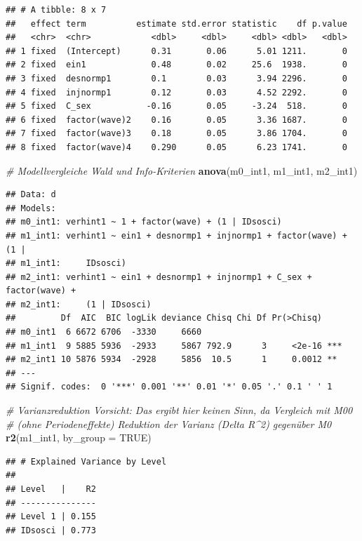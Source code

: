 \documentclass[
]{book}
\newenvironment{Shaded}{\begin{snugshade}}{\end{snugshade}}
\newcommand{\CommentTok}[1]{\textcolor[rgb]{0.56,0.35,0.01}{\textit{#1}}}
\newcommand{\DataTypeTok}[1]{\textcolor[rgb]{0.13,0.29,0.53}{#1}}
\newcommand{\KeywordTok}[1]{\textcolor[rgb]{0.13,0.29,0.53}{\textbf{#1}}}
\newcommand{\NormalTok}[1]{#1}
\newcommand{\OtherTok}[1]{\textcolor[rgb]{0.56,0.35,0.01}{#1}}
\begin{document}
\begin{verbatim}
## # A tibble: 8 x 7
##   effect term          estimate std.error statistic    df p.value
##   <chr>  <chr>            <dbl>     <dbl>     <dbl> <dbl>   <dbl>
## 1 fixed  (Intercept)      0.31       0.06      5.01 1211.       0
## 2 fixed  ein1             0.48       0.02     25.6  1938.       0
## 3 fixed  desnormp1        0.1        0.03      3.94 2296.       0
## 4 fixed  injnormp1        0.12       0.03      4.52 2292.       0
## 5 fixed  C_sex           -0.16       0.05     -3.24  518.       0
## 6 fixed  factor(wave)2    0.16       0.05      3.36 1687.       0
## 7 fixed  factor(wave)3    0.18       0.05      3.86 1704.       0
## 8 fixed  factor(wave)4    0.290      0.05      6.23 1741.       0
\end{verbatim}

\begin{Shaded}
\begin{Highlighting}[]
\CommentTok{# Modellvergleiche Wald und Info-Kriterien}
\KeywordTok{anova}\NormalTok{(m0_int1, m1_int1, m2_int1)}
\end{Highlighting}
\end{Shaded}

\begin{verbatim}
## Data: d
## Models:
## m0_int1: verhint1 ~ 1 + factor(wave) + (1 | IDsosci)
## m1_int1: verhint1 ~ ein1 + desnormp1 + injnormp1 + factor(wave) + (1 | 
## m1_int1:     IDsosci)
## m2_int1: verhint1 ~ ein1 + desnormp1 + injnormp1 + C_sex + factor(wave) + 
## m2_int1:     (1 | IDsosci)
##         Df  AIC  BIC logLik deviance Chisq Chi Df Pr(>Chisq)    
## m0_int1  6 6672 6706  -3330     6660                            
## m1_int1  9 5885 5936  -2933     5867 792.9      3     <2e-16 ***
## m2_int1 10 5876 5934  -2928     5856  10.5      1     0.0012 ** 
## ---
## Signif. codes:  0 '***' 0.001 '**' 0.01 '*' 0.05 '.' 0.1 ' ' 1
\end{verbatim}

\begin{Shaded}
\begin{Highlighting}[]
\CommentTok{# Varianzreduktion Vorsicht: Das ergibt hier keinen Sinn, da Vergleich mit M00}
\CommentTok{# (ohne Periodeneffekte) Reduktion der Varianz (Delta R^2) gegenüber M0}
\KeywordTok{r2}\NormalTok{(m1_int1, }\DataTypeTok{by_group =} \OtherTok{TRUE}\NormalTok{)}
\end{Highlighting}
\end{Shaded}

\begin{verbatim}
## # Explained Variance by Level
## 
## Level   |    R2
## ---------------
## Level 1 | 0.155
## IDsosci | 0.773
\end{verbatim}
\end{document}
